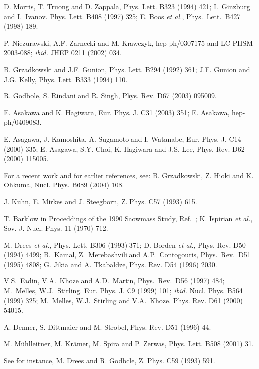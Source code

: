 \begin{thebibliography}{999}
 D. Morris, T. Truong and D. Zappala, Phys. Lett. B323
(1994) 421; I.~Ginzburg and I.~Ivanov. Phys. Lett. B408 (1997) 325;
E. Boos {\it et al.}, Phys.~Lett.~B427 (1998) 189.

 P. Niezurawski, A.F. Zarnecki and M. Krawczyk, 
hep-ph/0307175 and LC-PHSM-2003-088; {\it ibid.} JHEP 0211 (2002) 034. 

 B. Grzadkowski and J.F. Gunion, Phys. Lett. B294 (1992) 361;
J.F. Gunion and J.G. Kelly, Phys. Lett. B333 (1994) 110. 

 R. Godbole, S. Rindani and R. Singh, Phys. Rev. D67 
(2003) 095009.  

E. Asakawa and K. Hagiwara, Eur. Phys. J. C31 (2003) 351; E. Asakawa, 
hep-ph/0409083. 

E. Asagawa, J. Kamoshita, A. Sugamoto and I. Watanabe, Eur. Phys. J. C14 (2000) 335; E. Asagawa,  S.Y. Choi, K. Hagiwara and J.S. Lee, Phys. Rev. D62 (2000) 
115005. 

 For a recent work and for earlier references, see: 
B. Grzadkowski, Z. Hioki and K. Ohkuma, Nucl. Phys. B689 (2004) 108. 

J. Kuhn, E. Mirkes and J. Steegborn, Z. Phys. C57 (1993) 615. 

 T. Barklow in Proceddings of the 1990 Snowmass Study, 
Ref.~\cite{gamma-Rev-old}; K. Ispirian {\it et al.}, Sov. J. Nucl. Phys. 11 
(1970) 712. 

M. Drees {\it et al.}, Phys. Lett. B306 (1993) 371; 
D. Borden {\it et al.}, Phys. Rev. D50 (1994) 4499; 
B.~Kamal, Z.~Merebashvili and A.P.~Contogouris, Phys.~Rev.~D51 (1995) 4808;
G. Jikia and  A. Tkabaldze, Phys. Rev. D54 (1996) 2030. 

V.S.~Fadin, V.A.~Khoze and A.D.~Martin, Phys.~Rev.~D56 (1997) 484;
M.~Melles, W.J.~Stirling. Eur. Phys. J. C9 (1999) 101; {\it ibid.} Nucl. Phys. 
B564 (1999) 325; M.~Melles, W.J.~Stirling and V.A.~Khoze. Phys. Rev. D61 (2000)
54015.

 A. Denner, S. Dittmaier and M. Strobel, Phys. Rev. D51
(1996) 44. 

 M. M\"uhlleitner, M. Kr\"amer, M. Spira and P. Zerwas, 
Phys. Lett. B508 (2001) 31.  
 
 See for instance, M. Drees and R. Godbole, 
Z. Phys. C59 (1993) 591. 


\end{thebibliography}

